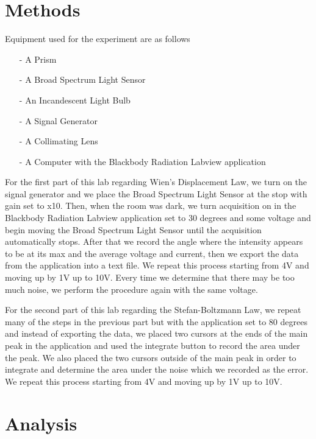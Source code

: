 \documentclass{article}
\begin{document}
\section{Methods}
Equipment used for the experiment are as follows
\begin{itemize}
    \item[-] A Prism
    \item[-] A Broad Spectrum Light Sensor
    \item[-] An Incandescent Light Bulb
    \item[-] A Signal Generator
    \item[-] A Collimating Lens
    \item[-] A Computer with the Blackbody Radiation Labview application
\end{itemize}
For the first part of this lab regarding Wien's Displacement Law, we turn on the 
signal generator and we place the Broad Spectrum Light Sensor at the stop with gain 
set to x10.  Then, when the room was dark, we turn acquisition on in the Blackbody
Radiation Labview application set to 30 degrees and some voltage and begin moving 
the Broad Spectrum Light Sensor until the acquisition automatically stops.  After that
we record the angle where the intensity appears to be at its max and the average voltage 
and current, then we export the data from the application into a text file.  We repeat 
this process starting from 4V and moving up by 1V up to 10V.  Every time we 
determine that there may be too much noise, we perform the procedure again with the same
voltage.

For the second part of this lab regarding the Stefan-Boltzmann Law, we repeat many of the 
steps in the previous part but with the application set to 80 degrees and instead of 
exporting the data, we placed two cursors at the ends of the main peak in the application 
and used the integrate button to record the area under the peak.  We also placed the two 
cursors outside of the main peak in order to integrate and determine the area under the 
noise which we recorded as the error.  We repeat this process starting from 4V and moving 
up by 1V up to 10V.

\newpage

\section{Analysis}
\end{document}
